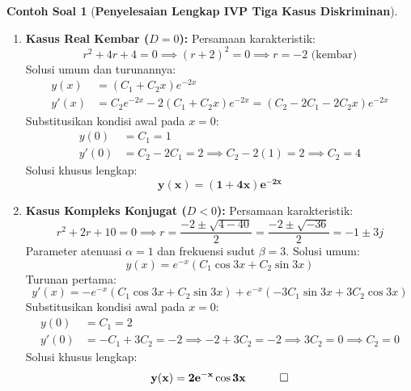 \documentclass[11pt,a4paper]{article}
\theoremstyle{definition}
\newtheorem{example}{Contoh Soal}[section]
\begin{document}
\begin{example}[\textbf{Penyelesaian Lengkap IVP Tiga Kasus Diskriminan}]
\begin{enumerate}[label=(\alph*), leftmargin=*]
    \item \textbf{Kasus Real Kembar ($D = 0$):}
    Persamaan karakteristik:
    \begin{equation*}
        r^2 + 4r + 4 = 0 \implies (r + 2)^2 = 0 \implies r = -2\text{ (kembar)}
    \end{equation*}
    Solusi umum dan turunannya:
    \begin{align*}
        y(x) &= (C_1 + C_2 x) e^{-2x} \\
        y'(x) &= C_2 e^{-2x} - 2(C_1 + C_2 x) e^{-2x} = (C_2 - 2C_1 - 2C_2 x) e^{-2x}
    \end{align*}
    Substitusikan kondisi awal pada $x = 0$:
    \begin{align*}
        y(0) &= C_1 = 1 \\
        y'(0) &= C_2 - 2C_1 = 2 \implies C_2 - 2(1) = 2 \implies C_2 = 4
    \end{align*}
    Solusi khusus lengkap:
    \begin{equation*}
        \mathbf{y(x) = (1 + 4x) e^{-2x}}
    \end{equation*}

    \item \textbf{Kasus Kompleks Konjugat ($D < 0$):}
    Persamaan karakteristik:
    \begin{equation*}
        r^2 + 2r + 10 = 0 \implies r = \frac{-2 \pm \sqrt{4 - 40}}{2} = \frac{-2 \pm \sqrt{-36}}{2} = -1 \pm 3j
    \end{equation*}
    Parameter atenuasi $\alpha = 1$ dan frekuensi sudut $\beta = 3$. Solusi umum:
    \begin{equation*}
        y(x) = e^{-x} \left( C_1 \cos 3x + C_2 \sin 3x \right)
    \end{equation*}
    Turunan pertama:
    \begin{equation*}
        y'(x) = -e^{-x} \left( C_1 \cos 3x + C_2 \sin 3x \right) + e^{-x} \left( -3C_1 \sin 3x + 3C_2 \cos 3x \right)
    \end{equation*}
    Substitusikan kondisi awal pada $x = 0$:
    \begin{align*}
        y(0) &= C_1 = 2 \\
        y'(0) &= -C_1 + 3C_2 = -2 \implies -2 + 3C_2 = -2 \implies 3C_2 = 0 \implies C_2 = 0
    \end{align*}
    Solusi khusus lengkap:
    \begin{equation*}
        \mathbf{y(x) = 2 e^{-x} \cos 3x} \quad \qed
    \end{equation*}
\end{enumerate}
\end{example}
\end{document}
